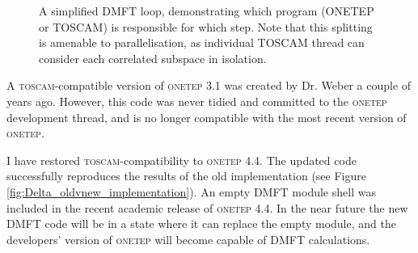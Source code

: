 \documentclass[10pt,a4paper,final]{article}
\begin{document}
\begin{figure}[!t]
{
   }
   \caption{A simplified DMFT loop, demonstrating which program (ONETEP or TOSCAM) is responsible for which step. Note that this splitting is amenable to parallelisation, as individual TOSCAM thread can consider each correlated subspace in isolation.}
   \label{fig:DMFT_integration_ONETEP_and_TOSCAM}
\end{figure}

A \textsc{toscam}-compatible version of \textsc{onetep} 3.1 was created by Dr. Weber a couple of years ago. However, this code was never tidied and committed to the \textsc{onetep} development thread, and is no longer compatible with the most recent version of \textsc{onetep}.

I have restored \textsc{toscam}-compatibility to \textsc{onetep} 4.4. The updated code successfully reproduces the results of the old implementation (see Figure \ref{fig:Delta_oldvnew_implementation}). An empty DMFT module shell was included in the recent academic release of \textsc{onetep} 4.4. In the near future the new DMFT code will be in a state where it can replace the empty module, and the developers' version of \textsc{onetep} will become capable of DMFT calculations.
\end{document}
